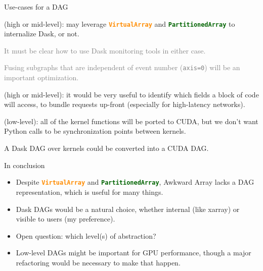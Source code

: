 \documentclass[aspectratio=169]{beamer}
\begin{document}
\begin{frame}{Use-cases for a DAG}
\large
\vspace{0.3 cm}
\begin{description}\setlength{\itemsep}{0.25 cm}
\item[\bf Distributed computing] (high or mid-level): may leverage \textcolor{darkorange}{\tt\textbf{VirtualArray}} and \textcolor{darkgreen}{\tt\textbf{PartitionedArray}} to internalize Dask, or not.

\vspace{0.2 cm}
\textcolor{gray}{It must be clear how to use Dask monitoring tools in either case.}

\vspace{0.2 cm}
\textcolor{gray}{Fusing subgraphs that are independent of event number ({\tt axis=0}) will be an important optimization.}

\item[\bf Static analysis] (high or mid-level): it would be very useful to identify which fields a block of code will access, to bundle requests up-front (especially for high-latency networks).

\item[\bf Streamlining GPU code] (low-level): all of the kernel functions will be ported to CUDA, but we don't want Python calls to be synchronization points between kernels.

\vspace{0.2 cm}
A Dask DAG over kernels could be converted into a CUDA DAG.
\end{description}
\end{frame}

\begin{frame}{In conclusion}
\large
\vspace{0.5 cm}
\begin{itemize}\setlength{\itemsep}{0.5 cm}
\item Despite \textcolor{darkorange}{\tt\textbf{VirtualArray}} and \textcolor{darkgreen}{\tt\textbf{PartitionedArray}}, Awkward Array lacks a DAG representation, which is useful for many things.

\item Dask DAGs would be a natural choice, whether internal (like xarray) or visible to users (my preference).

\item Open question: which level(s) of abstraction?

\item Low-level DAGs might be important for GPU performance, though a major refactoring would be necessary to make that happen.
\end{itemize}
\end{frame}
\end{document}
